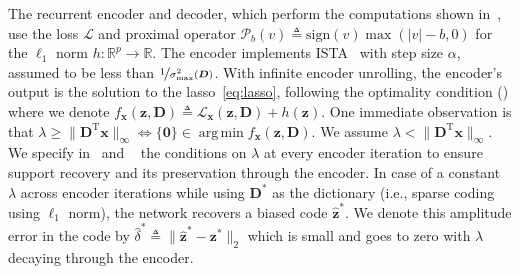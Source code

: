 \documentclass[10pt]{article} %
\newcommand{\R}{\mathbb{R}} %
\newcommand{\D}{{\bm D}}
\newcommand{\x}{{\bm x}}
\newcommand{\z}{{\bm z}}
\newcommand{\zero}{{\bm 0}}
\newcommand{\Loss}{\mathcal{L}}
\newcommand{\prox}{\mathcal{P}}
\DeclareMathOperator*{\argmin}{arg\,min}
\begin{document}
The recurrent encoder and decoder, which perform the computations shown in~, use the loss $\Loss$ and proximal operator $\prox_{ b}(v) \triangleq \text{sign}(v) \max( | v | - b, 0)$ for the $\ell_1$ norm $h \colon \R^p \to \R$. The encoder implements ISTA~\citep{daubehies2004ista, blumensath2008ista} with step size $\alpha$, assumed to be less than $\nicefrac{1}{\sigma_{\text{max}}^2(\D)}$. With infinite encoder unrolling, the encoder's output is the solution to the lasso~\eqref{eq:lasso}, following the optimality condition () where we denote $f_{\x}(\z, \D) \triangleq \Loss_{\x}(\z, \D) + h(\z)$. One immediate observation is that $\lambda \geq \|\D^{\text{T}} \x \|_{\infty} \Leftrightarrow \{\zero\} \in \argmin f_{\x}(\z, \D)$. We assume $\lambda < \|\D^{\text{T}} \x \|_{\infty}$. We specify in~ and ~ the conditions on $\lambda$ at every encoder iteration to ensure support recovery and its preservation through the encoder. In case of a constant $\lambda$ across encoder iterations while using $\D^{\ast}$ as the dictionary (i.e., sparse coding using $\ell_1$ norm), the network recovers a biased code $\hat \z^{\ast}$. We denote this amplitude error in the code by $\hat \delta^{\ast} \triangleq \| \hat \z^{\ast} - \z^{\ast} \|_2$ which is small and goes to zero with $\lambda$ decaying through the encoder.
\end{document}

